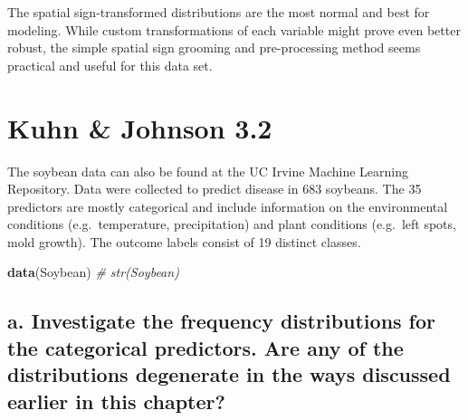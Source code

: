 \documentclass[openany]{book}
\newenvironment{Shaded}{\begin{snugshade}}{\end{snugshade}}
\newcommand{\CommentTok}[1]{\textcolor[rgb]{0.56,0.35,0.01}{\textit{#1}}}
\newcommand{\KeywordTok}[1]{\textcolor[rgb]{0.13,0.29,0.53}{\textbf{#1}}}
\newcommand{\NormalTok}[1]{#1}
\renewenvironment{quote}{\begin{myquote}}{\end{myquote}}
\begin{document}
The spatial sign-transformed distributions are the most normal and best for modeling. While custom transformations of each variable might prove even better robust, the simple spatial sign grooming and pre-processing method seems practical and useful for this data set.

\hypertarget{kuhn-johnson-3.2}{%
\section{Kuhn \& Johnson 3.2}\label{kuhn-johnson-3.2}}

\begin{quote}
The soybean data can also be found at the UC Irvine Machine Learning Repository. Data were collected to predict disease in 683 soybeans. The 35 predictors are mostly categorical and include information on the environmental conditions (e.g.~temperature, precipitation) and plant conditions (e.g.~left spots, mold growth). The outcome labels consist of 19 distinct classes.
\end{quote}

\begin{Shaded}
\begin{Highlighting}[]
\KeywordTok{data}\NormalTok{(Soybean)}
\CommentTok{# str(Soybean)}
\end{Highlighting}
\end{Shaded}

\hypertarget{a.-investigate-the-frequency-distributions-for-the-categorical-predictors.-are-any-of-the-distributions-degenerate-in-the-ways-discussed-earlier-in-this-chapter}{%
\subsection{a. Investigate the frequency distributions for the categorical predictors. Are any of the distributions degenerate in the ways discussed earlier in this chapter?}\label{a.-investigate-the-frequency-distributions-for-the-categorical-predictors.-are-any-of-the-distributions-degenerate-in-the-ways-discussed-earlier-in-this-chapter}}
\end{document}
